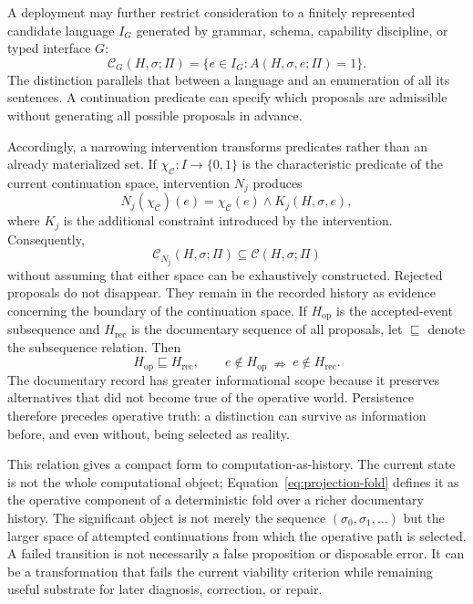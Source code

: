 \documentclass[11pt]{article}
\begin{document}
A deployment may further restrict consideration to a finitely represented candidate language $I_G$ generated by grammar, schema, capability discipline, or typed interface $G$:
\begin{equation}
  \mathcal{C}_G(H,\sigma;\Pi)
  =\{e\in I_G:A(H,\sigma,e;\Pi)=1\}.
  \label{eq:generated-continuation-space}
\end{equation}
The distinction parallels that between a language and an enumeration of all its sentences. A continuation predicate can specify which proposals are admissible without generating all possible proposals in advance.

Accordingly, a narrowing intervention transforms predicates rather than an already materialized set. If $\chi_{\mathcal{C}}:I\to\{0,1\}$ is the characteristic predicate of the current continuation space, intervention $N_j$ produces
\begin{equation}
  N_j(\chi_{\mathcal{C}})(e)
  =\chi_{\mathcal{C}}(e)\land K_j(H,\sigma,e),
  \label{eq:predicate-narrowing}
\end{equation}
where $K_j$ is the additional constraint introduced by the intervention. Consequently,
\begin{equation}
  \mathcal{C}_{N_j}(H,\sigma;\Pi)
  \subseteq\mathcal{C}(H,\sigma;\Pi)
\end{equation}
without assuming that either space can be exhaustively constructed.
Rejected proposals do not disappear. They remain in the recorded history as evidence concerning the boundary of the continuation space. If $H_{\mathrm{op}}$ is the accepted-event subsequence and $H_{\mathrm{rec}}$ is the documentary sequence of all proposals, let $\sqsubseteq$ denote the subsequence relation. Then
\begin{equation}
  H_{\mathrm{op}}\sqsubseteq H_{\mathrm{rec}},
  \qquad
  e\notin H_{\mathrm{op}}\ \nRightarrow\ e\notin H_{\mathrm{rec}}.
  \label{eq:two-histories}
\end{equation}
The documentary record has greater informational scope because it preserves alternatives that did not become true of the operative world. Persistence therefore precedes operative truth: a distinction can survive as information before, and even without, being selected as reality.

This relation gives a compact form to computation-as-history. The current state is not the whole computational object; Equation~\ref{eq:projection-fold} defines it as the operative component of a deterministic fold over a richer documentary history. The significant object is not merely the sequence $(\sigma_0,\sigma_1,\ldots)$ but the larger space of attempted continuations from which the operative path is selected. A failed transition is not necessarily a false proposition or disposable error. It can be a transformation that fails the current viability criterion while remaining useful substrate for later diagnosis, correction, or repair.
\end{document}
